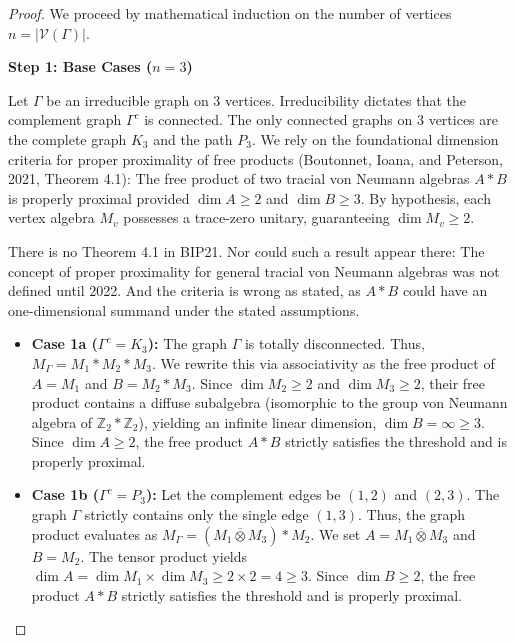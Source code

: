 \documentclass[12pt]{article}
\newcommand{\VV}{\mathcal{V}}
\newcommand{\review}[1]{\begin{reviewbox}#1\end{reviewbox}}
\begin{document}
\begin{proof}
We proceed by mathematical induction on the number of vertices $n = |\VV(\Gamma)|$. 

\medskip\noindent\textbf{Step 1: Base Cases ($n=3$)}

Let $\Gamma$ be an irreducible graph on 3 vertices. Irreducibility dictates that the complement graph $\Gamma^c$ is connected. The only connected graphs on 3 vertices are the complete graph $K_3$ and the path $P_3$. 
We rely on the foundational dimension criteria for proper proximality of free products (Boutonnet, Ioana, and Peterson, 2021, Theorem 4.1): The free product of two tracial von Neumann algebras $A \ast B$ is properly proximal provided $\dim A \ge 2$ and $\dim B \ge 3$. By hypothesis, each vertex algebra $M_v$ possesses a trace-zero unitary, guaranteeing $\dim M_v \ge 2$.

\review{There is no Theorem 4.1 in BIP21. Nor could such a result appear there: The concept of proper proximality for general tracial von Neumann  algebras was not defined until 2022. And the criteria is wrong as stated, as $A \ast B$ could have an one-dimensional summand under the stated assumptions.}

\begin{itemize}
    \item \textbf{Case 1a ($\Gamma^c = K_3$):} The graph $\Gamma$ is totally disconnected. Thus, $M_\Gamma = M_1 \ast M_2 \ast M_3$. We rewrite this via associativity as the free product of $A = M_1$ and $B = M_2 \ast M_3$. Since $\dim M_2 \ge 2$ and $\dim M_3 \ge 2$, their free product contains a diffuse subalgebra (isomorphic to the group von Neumann algebra of $\mathbb{Z}_2 \ast \mathbb{Z}_2$), yielding an infinite linear dimension, $\dim B = \infty \ge 3$. Since $\dim A \ge 2$, the free product $A \ast B$ strictly satisfies the threshold and is properly proximal.
    
    \item \textbf{Case 1b ($\Gamma^c = P_3$):} Let the complement edges be $(1,2)$ and $(2,3)$. The graph $\Gamma$ strictly contains only the single edge $(1,3)$. Thus, the graph product evaluates as $M_\Gamma = (M_1 \overline{\otimes} M_3) \ast M_2$. We set $A = M_1 \overline{\otimes} M_3$ and $B = M_2$. The tensor product yields $\dim A = \dim M_1 \times \dim M_3 \ge 2 \times 2 = 4 \ge 3$. Since $\dim B \ge 2$, the free product $A \ast B$ strictly satisfies the threshold and is properly proximal.
\end{itemize}


\end{proof}
\end{document}
